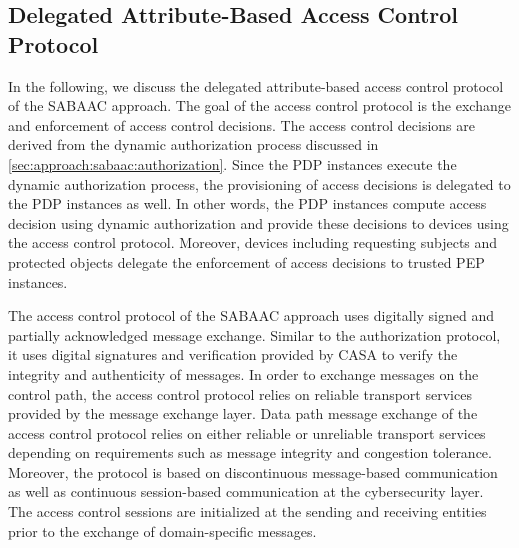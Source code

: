 \subsection{Delegated Attribute-Based Access Control Protocol}
\label{sec:approach:sabaac:accesscontrol}
In the following, we discuss the delegated attribute-based access control protocol of the SABAAC approach.
The goal of the access control protocol is the exchange and enforcement of access control decisions.
The access control decisions are derived from the dynamic authorization process discussed in \autoref{sec:approach:sabaac:authorization}.
Since the PDP instances execute the dynamic authorization process, the provisioning of access decisions is delegated to the PDP instances as well.
In other words, the PDP instances compute access decision using dynamic authorization and provide these decisions to devices using the access control protocol.
Moreover, devices including requesting subjects and protected objects delegate the enforcement of access decisions to trusted PEP instances.

The access control protocol of the SABAAC approach uses digitally signed and partially acknowledged message exchange.
Similar to the authorization protocol, it uses digital signatures and verification provided by CASA to verify the integrity and authenticity of messages.
In order to exchange messages on the control path, the access control protocol relies on reliable transport services provided by the message exchange layer.
Data path message exchange of the access control protocol relies on either reliable or unreliable transport services depending on requirements such as message integrity and congestion tolerance.
Moreover, the protocol is based on discontinuous message-based communication as well as continuous session-based communication at the cybersecurity layer.
The access control sessions are initialized at the sending and receiving entities prior to the exchange of domain-specific messages.

